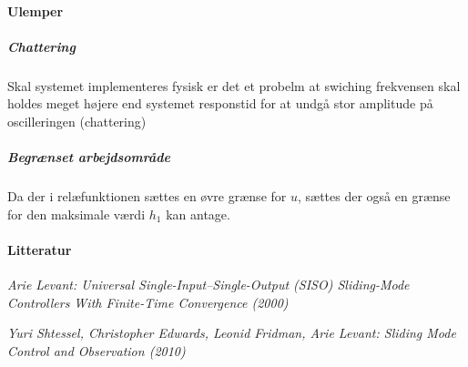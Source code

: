 \paragraph{ Ulemper }
\subparagraph{ Chattering }
	Skal systemet implementeres fysisk er det et probelm at swiching frekvensen
	skal holdes meget højere end systemet responstid for at undgå stor amplitude på
	oscilleringen (chattering)
\subparagraph{ Begrænset arbejdsområde }
	Da der i relæfunktionen sættes en øvre grænse for $u$, sættes der også en
	grænse for den maksimale værdi $h_1$ kan antage.





\paragraph{ Litteratur }
\emph{
Arie Levant:
Universal Single-Input–Single-Output (SISO)
Sliding-Mode Controllers With Finite-Time
Convergence
(2000)}

\emph{
Yuri Shtessel,
Christopher Edwards,
Leonid Fridman,
Arie Levant:
Sliding Mode Control
and Observation
(2010)}
